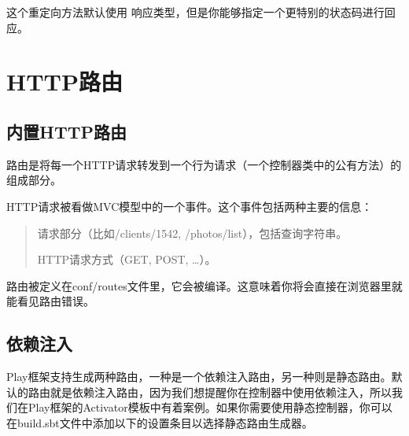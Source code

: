 \documentclass[letterpaper,10pt,english]{sphinxmanual}
\begin{document}
\begin{sphinxVerbatim}[commandchars=\\\{\}]
   
   
\end{sphinxVerbatim}

这个重定向方法默认使用  响应类型，但是你能够指定一个更特别的状态码进行回应。

\begin{sphinxVerbatim}[commandchars=\\\{\}]
   
   
\end{sphinxVerbatim}


\section{HTTP路由}
\label{\detokenize{index:id16}}

\subsection{内置HTTP路由}
\label{\detokenize{index:id17}}
路由是将每一个HTTP请求转发到一个行为请求（一个控制器类中的公有方法）的组成部分。

HTTP请求被看做MVC模型中的一个事件。这个事件包括两种主要的信息：
\begin{quote}

请求部分（比如/clients/1542, /photos/list），包括查询字符串。

HTTP请求方式（GET, POST, …）。
\end{quote}

路由被定义在conf/routes文件里，它会被编译。这意味着你将会直接在浏览器里就能看见路由错误。


\subsection{依赖注入}
\label{\detokenize{index:id18}}
Play框架支持生成两种路由，一种是一个依赖注入路由，另一种则是静态路由。默认的路由就是依赖注入路由，因为我们想提醒你在控制器中使用依赖注入，所以我们在Play框架的Activator模板中有着案例。如果你需要使用静态控制器，你可以在build.sbt文件中添加以下的设置条目以选择静态路由生成器。
\end{document}

